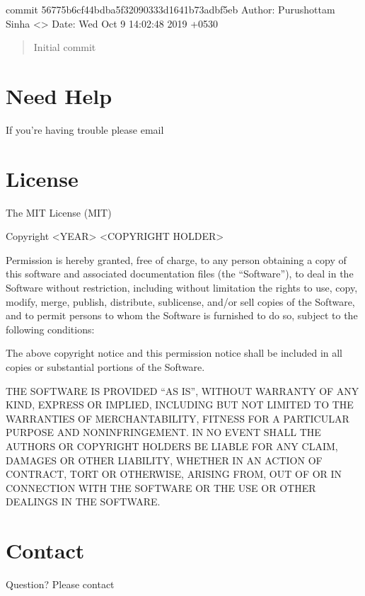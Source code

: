 \documentclass[letterpaper,10pt,english]{sphinxmanual}
\begin{document}
commit 56775b6cf44bdba5f32090333d1641b73adbf5eb
Author: Purushottam Sinha \textless{}\textgreater{}
Date:   Wed Oct 9 14:02:48 2019 +0530
\begin{quote}

Initial commit
\end{quote}


\chapter{Need Help}
\label{\detokenize{help:need-help}}\label{\detokenize{help::doc}}
If you’re having trouble please email 


\chapter{License}
\label{\detokenize{license:license}}\label{\detokenize{license::doc}}
The MIT License (MIT)

Copyright \textless{}YEAR\textgreater{} \textless{}COPYRIGHT HOLDER\textgreater{}

Permission is hereby granted, free of charge, to any person obtaining a copy of this software and associated documentation files (the “Software”), to deal in the Software without restriction, including without limitation the rights to use, copy, modify, merge, publish, distribute, sublicense, and/or sell copies of the Software, and to permit persons to whom the Software is furnished to do so, subject to the following conditions:

The above copyright notice and this permission notice shall be included in all copies or substantial portions of the Software.

THE SOFTWARE IS PROVIDED “AS IS”, WITHOUT WARRANTY OF ANY KIND, EXPRESS OR IMPLIED, INCLUDING BUT NOT LIMITED TO THE WARRANTIES OF MERCHANTABILITY, FITNESS FOR A PARTICULAR PURPOSE AND NONINFRINGEMENT. IN NO EVENT SHALL THE AUTHORS OR COPYRIGHT HOLDERS BE LIABLE FOR ANY CLAIM, DAMAGES OR OTHER LIABILITY, WHETHER IN AN ACTION OF CONTRACT, TORT OR OTHERWISE, ARISING FROM, OUT OF OR IN CONNECTION WITH THE SOFTWARE OR THE USE OR OTHER DEALINGS IN THE SOFTWARE.


\chapter{Contact}
\label{\detokenize{license:contact}}
Question? Please contact 



\renewcommand{\indexname}{Index}
\printindex
\end{document}
